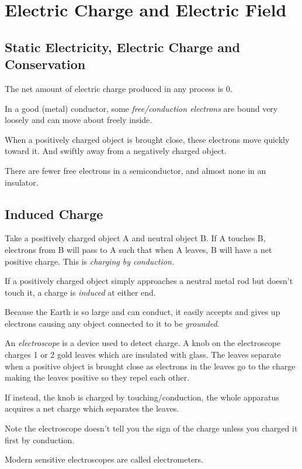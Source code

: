 \chapter{Electric Charge and Electric Field}

\section{Static Electricity, Electric Charge and Conservation}

\begin{definition}
    The net amount of electric charge produced in any process is 0.
\end{definition}
\begin{definition}
    In a good (metal) conductor, some \emph{free/conduction electrons} are bound very loosely and can move about freely inside.

    When a positively charged object is brought close, these electrons move quickly toward it. And swiftly away from a negatively charged object.

    There are fewer free electrons in a semiconductor, and almost none in an insulator.
\end{definition}

\section{Induced Charge}

\begin{definition}
    Take a positively charged object A and neutral object B. If A touches B, electrons from B will pass to A such that when A leaves, B will have a net positive charge. This is \emph{charging by conduction.}
\end{definition}
\begin{definition}
    If a positively charged object simply approaches a neutral metal rod but doesn't touch it, a charge is \emph{induced} at either end.
\end{definition}
\begin{definition}[Grounded]
    Because the Earth is so large and can conduct, it easily accepts and gives up electrons causing any object connected to it to be \emph{grounded}.
\end{definition}
\begin{definition}[Electroscope]
    An \emph{electroscope} is a device used to detect charge. A knob on the electroscope charges 1 or 2 gold leaves which are insulated with glass. The leaves separate when a positive object is brought close as electrons in the leaves go to the charge making the leaves positive so they repel each other.
    
    If instead, the  knob is charged by touching/conduction, the whole apparatus acquires a net charge which separates the leaves.

    Note the electroscope doesn't tell you the sign of the charge unless you charged it first by conduction.

    Modern sensitive electroscopes are called electrometers.
\end{definition}

